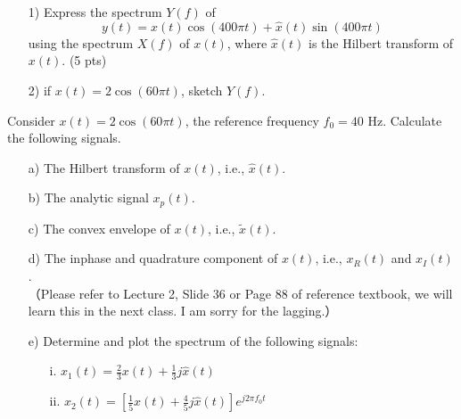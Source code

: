 \documentclass{assignment}
\begin{document}
\begin{prob}
    \begin{itemize}
        \item[1)] Express the spectrum $Y(f)$ of
        \[
            y(t)=x(t)\cos(400\pi t)+\hat{x}(t)\sin(400\pi t)
        \]
        using the spectrum $X(f)$ of $x(t)$, where $\hat{x}(t)$ is the Hilbert transform of $x(t)$. (5 pts)
        \item[2)] if $x(t)=2\cos(60\pi t)$, sketch $Y(f).$
    \end{itemize}
\end{prob}
\begin{sol}

\end{sol}

\begin{prob}
    Consider $x(t)=2\cos(60\pi t)$, the reference frequency $f_0=40$ Hz. Calculate the following signals.
    \begin{itemize}
        \item[a)] The Hilbert transform of $x(t)$, i.e., $\hat{x}(t)$.
        \item[b)] The analytic signal $x_p(t)$.
        \item[c)] The convex envelope of $x(t)$, i.e., $\tilde{x}(t)$.
        \item[d)] The inphase and quadrature component of $x(t)$, i.e., $x_R(t)$ and $x_I(t)$.\\
        （Please refer to Lecture 2, Slide 36 or Page 88 of reference textbook, we will learn this in the next class. I am sorry for the lagging.）
        \item[e)] Determine and plot the spectrum of the following signals:
        \begin{itemize}
            \item[i.] $x_1(t)=\frac{2}{3}x(t)+\frac{1}{3}j\hat{x}(t)$
            \item[ii.] $x_2(t)=\left[\frac{1}{5}x(t)+\frac{4}{5}j\hat{x}(t)\right]e^{j2\pi f_0t}$
        \end{itemize}
    \end{itemize}
\end{prob}
\begin{sol}

\end{sol}
\end{document}
